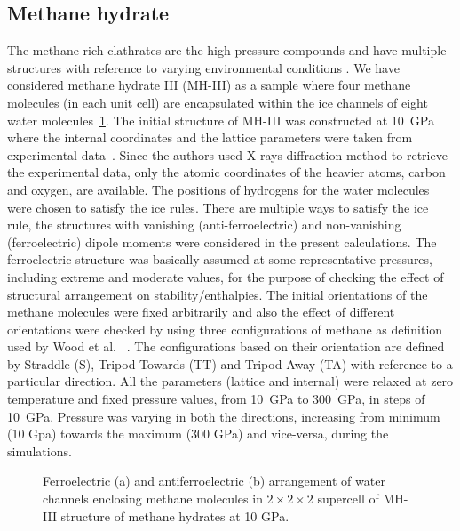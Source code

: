 \subsection{Methane hydrate} \label{hydrate_system}
The methane-rich clathrates are the high pressure compounds and have multiple structures with reference to varying environmental conditions \citep{SloanJr2007}. We have considered methane hydrate III (MH-III) as a sample where four methane molecules (in each unit cell) are encapsulated within the ice channels of eight water molecules~\ref{MH-III-stru}. The initial structure of MH-III was constructed at 10~GPa where the internal coordinates and the lattice parameters were taken from experimental data~\citep{Loveday2001}. Since the authors used X-rays diffraction method to retrieve the experimental data, only the atomic coordinates of the heavier atoms, carbon and oxygen, are available. The positions of hydrogens for the water molecules were chosen to satisfy the ice rules. There are multiple ways to satisfy the ice rule, the structures with vanishing (anti-ferroelectric) and non-vanishing (ferroelectric) dipole moments were considered in the present calculations. The ferroelectric structure was basically assumed at some representative pressures, including extreme and moderate values, for the purpose of checking the effect of structural arrangement on stability/enthalpies. The initial orientations of the methane molecules were fixed arbitrarily and also the effect of different orientations were checked by using three configurations of methane as definition used by Wood et al. ~\citep{Wood2012}. The configurations based on their orientation are defined by Straddle (S), Tripod Towards (TT) and Tripod Away (TA) with reference to a particular direction. All the parameters (lattice and internal) were relaxed at zero temperature and fixed pressure values, from 10~GPa to 300~GPa, in steps of 10~GPa. Pressure was varying in both the directions, increasing from minimum (10 Gpa) towards the maximum (300 GPa) and vice-versa, during the simulations. 
 
\begin{figure}[h!]
\begin{center} 
\end{center}
\caption[Ferroelectric and antiferroelectric arrangement of water channels enclosing methane molecules in $2\times2\times2$ supercell of MH-III structure.]{ Ferroelectric (a) and antiferroelectric (b) arrangement of water channels enclosing methane molecules in $2\times2\times2$ supercell of MH-III structure of methane hydrates at 10 GPa.}
\label{MH-III-stru}
\end{figure}

